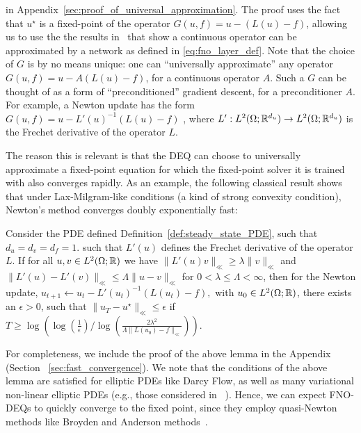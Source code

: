 in Appendix~\ref{sec:proof_of_universal_approximation}.
The proof uses the fact
that $u^\star$ 
is a fixed-point of the operator
$G(u, f) = u - (L(u) - f)$, allowing us to use the 
the results in~\citet{kovachki2021universal}
that show a continuous operator can be approximated
by a network as defined in \eqref{eq:fno_layer_def}.
Note that the choice of $G$ is by no means unique: one can ``universally approximate'' any operator $G(u, f) = u - A(L(u) - f)$, for a continuous operator $A$. 
Such a $G$ can be thought of as a form of ``preconditioned'' gradient descent, for a preconditioner $A$. For example, a Newton update has the form
$G(u,f) = u - L'(u)^{-1} \left(L(u) - f\right)$
,
where $L': L^2(\Omega; \mathbb{R}^{d_u}) \to L^2(\Omega; \mathbb{R}^{d_u})$
is the Frechet derivative of the operator $L$.  

The reason this is relevant is that the DEQ can choose to universally approximate a fixed-point equation for which the fixed-point solver it is trained with also converges rapidly. As an example, the following classical result shows that under Lax-Milgram-like conditions (a kind of strong convexity condition), Newton's method %
converges doubly exponentially fast:
\begin{lemma}
    \label{lemma:fast_convergence}
   Consider the PDE defined Definition~\ref{def:steady_state_PDE},
   such that $d_u=d_v=d_f=1$.
   such that $L'(u)$ defines the Frechet derivative 
   of the operator $L$.
   If for all $u,v \in L^2(\Omega; \mathbb{R})$ we have
   $\| L'(u) v\|_{\ll} \geq \lambda \|v\|_{\ll}$
   and 
   $\|L'(u) - L'(v)\|_{\ll} \leq \Lambda \|u - v\|_{\ll}$
   for $0 < \lambda \leq \Lambda <\infty $,
   then for the Newton update,
   $
       u_{t+1} \leftarrow u_t - L'(u_t)^{-1}\left(L(u_t) - f\right),
   $
   with $u_0 \in L^2(\Omega; \mathbb{R})$, there exists an $\epsilon > 0$,
   such that  $\|u_T - u^\star\|_{\ll} \leq \epsilon$
   if 
    $
       T \geq \log 
       \left(
           \log \left(\frac{1}{\epsilon}\right) 
           /
           \log \left(\frac{2\lambda^2}{\Lambda\|L(u_0) - f\|_{\ll}}\right)
        \right).
    $
\end{lemma}

For completeness, we include the proof of the above lemma in the Appendix (Section ~\ref{sec:fast_convergence}).
We note that the conditions of the above lemma are satisfied for elliptic PDEs like Darcy Flow,
as well as many variational non-linear elliptic PDEs (e.g., those considered in ~\citet{marwah2022neural}). 
Hence, we can expect FNO-DEQs to quickly converge to the fixed point, since they employ quasi-Newton methods
like Broyden and Anderson methods~\citep{broyden1965class, anderson1965iterative}. %













